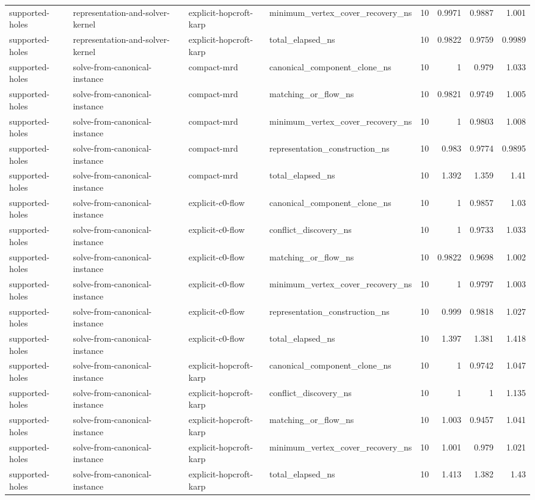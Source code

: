\begin{table}[t]
\begin{tabular}{llllrrrr}
supported-holes & representation-and-solver-kernel & explicit-hopcroft-karp & minimum\_vertex\_cover\_recovery\_ns & 10 & 0.9971 & 0.9887 & 1.001 \\
supported-holes & representation-and-solver-kernel & explicit-hopcroft-karp & total\_elapsed\_ns & 10 & 0.9822 & 0.9759 & 0.9989 \\
supported-holes & solve-from-canonical-instance & compact-mrd & canonical\_component\_clone\_ns & 10 & 1 & 0.979 & 1.033 \\
supported-holes & solve-from-canonical-instance & compact-mrd & matching\_or\_flow\_ns & 10 & 0.9821 & 0.9749 & 1.005 \\
supported-holes & solve-from-canonical-instance & compact-mrd & minimum\_vertex\_cover\_recovery\_ns & 10 & 1 & 0.9803 & 1.008 \\
supported-holes & solve-from-canonical-instance & compact-mrd & representation\_construction\_ns & 10 & 0.983 & 0.9774 & 0.9895 \\
supported-holes & solve-from-canonical-instance & compact-mrd & total\_elapsed\_ns & 10 & 1.392 & 1.359 & 1.41 \\
supported-holes & solve-from-canonical-instance & explicit-c0-flow & canonical\_component\_clone\_ns & 10 & 1 & 0.9857 & 1.03 \\
supported-holes & solve-from-canonical-instance & explicit-c0-flow & conflict\_discovery\_ns & 10 & 1 & 0.9733 & 1.033 \\
supported-holes & solve-from-canonical-instance & explicit-c0-flow & matching\_or\_flow\_ns & 10 & 0.9822 & 0.9698 & 1.002 \\
supported-holes & solve-from-canonical-instance & explicit-c0-flow & minimum\_vertex\_cover\_recovery\_ns & 10 & 1 & 0.9797 & 1.003 \\
supported-holes & solve-from-canonical-instance & explicit-c0-flow & representation\_construction\_ns & 10 & 0.999 & 0.9818 & 1.027 \\
supported-holes & solve-from-canonical-instance & explicit-c0-flow & total\_elapsed\_ns & 10 & 1.397 & 1.381 & 1.418 \\
supported-holes & solve-from-canonical-instance & explicit-hopcroft-karp & canonical\_component\_clone\_ns & 10 & 1 & 0.9742 & 1.047 \\
supported-holes & solve-from-canonical-instance & explicit-hopcroft-karp & conflict\_discovery\_ns & 10 & 1 & 1 & 1.135 \\
supported-holes & solve-from-canonical-instance & explicit-hopcroft-karp & matching\_or\_flow\_ns & 10 & 1.003 & 0.9457 & 1.041 \\
supported-holes & solve-from-canonical-instance & explicit-hopcroft-karp & minimum\_vertex\_cover\_recovery\_ns & 10 & 1.001 & 0.979 & 1.021 \\
supported-holes & solve-from-canonical-instance & explicit-hopcroft-karp & total\_elapsed\_ns & 10 & 1.413 & 1.382 & 1.43 \\
\bottomrule
\end{tabular}
\end{table}


